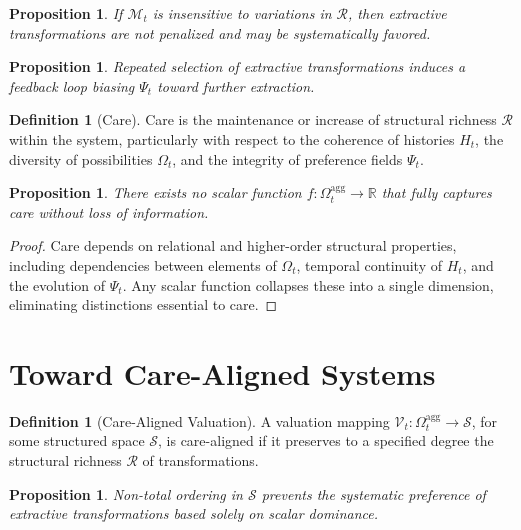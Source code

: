 \documentclass[11pt,a4paper]{article}
\newtheorem{proposition}[theorem]{Proposition}
\theoremstyle{definition}
\newtheorem{definition}[theorem]{Definition}
\theoremstyle{remark}
\begin{document}
\begin{proposition}
If $\mathcal{M}_t$ is insensitive to variations in $\mathcal{R}$, then extractive transformations are not penalized and may be systematically favored.
\end{proposition}

\begin{proposition}
Repeated selection of extractive transformations induces a feedback loop biasing $\Psi_t$ toward further extraction.
\end{proposition}

\begin{definition}[Care]
Care is the maintenance or increase of structural richness $\mathcal{R}$ within the system, particularly with respect to the coherence of histories $H_t$, the diversity of possibilities $\Omega_t$, and the integrity of preference fields $\Psi_t$.
\end{definition}

\begin{proposition}
There exists no scalar function $f : \Omega_t^{\mathrm{agg}} \rightarrow \mathbb{R}$ that fully captures care without loss of information.
\end{proposition}

\begin{proof}
Care depends on relational and higher-order structural properties, including dependencies between elements of $\Omega_t$, temporal continuity of $H_t$, and the evolution of $\Psi_t$. Any scalar function collapses these into a single dimension, eliminating distinctions essential to care.
\end{proof}

\section{Toward Care-Aligned Systems}

\begin{definition}[Care-Aligned Valuation]
A valuation mapping $\mathcal{V}_t : \Omega_t^{\mathrm{agg}} \rightarrow \mathcal{S}$, for some structured space $\mathcal{S}$, is care-aligned if it preserves to a specified degree the structural richness $\mathcal{R}$ of transformations.
\end{definition}

\begin{proposition}
Non-total ordering in $\mathcal{S}$ prevents the systematic preference of extractive transformations based solely on scalar dominance.
\end{proposition}
\end{document}
